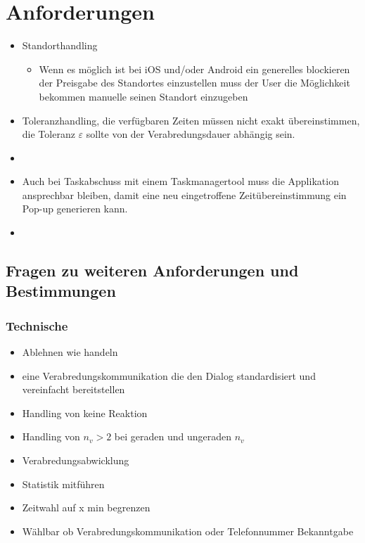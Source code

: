 \section{Anforderungen}

\begin{itemize}
\item Standorthandling
\begin{itemize}
\item Wenn es möglich ist bei iOS und/oder Android ein generelles blockieren der Preisgabe des Standortes einzustellen muss der User die Möglichkeit bekommen manuelle seinen Standort einzugeben
\end{itemize}
\item Toleranzhandling, die verfügbaren Zeiten müssen nicht exakt übereinstimmen, die Toleranz $\varepsilon$ sollte von der Verabredungsdauer abhängig sein.
\item {}
\item Auch bei Taskabschuss mit einem Taskmanagertool muss die Applikation ansprechbar bleiben, damit eine neu eingetroffene Zeitübereinstimmung ein Pop-up generieren kann.
\item {} 
\end{itemize}




\subsection{Fragen zu weiteren Anforderungen und Bestimmungen}

\subsubsection{Technische}


\begin{itemize}
\item Ablehnen wie handeln
\item eine Verabredungskommunikation die den Dialog standardisiert und vereinfacht bereitstellen
\item Handling von keine Reaktion
\item Handling von $n_v>2$ bei geraden und ungeraden $n_v$
\item Verabredungsabwicklung
\item Statistik mitführen
\item Zeitwahl auf x min begrenzen
\item Wählbar ob Verabredungskommunikation oder Telefonnummer Bekanntgabe
\end{itemize}

